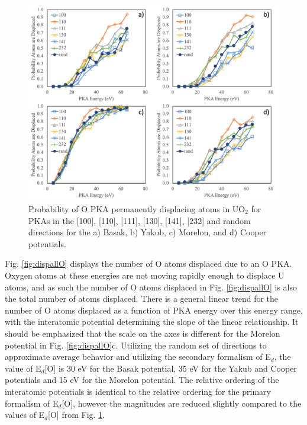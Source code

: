 \documentclass[review]{elsarticle}
\begin{document}
\begin{figure}[h]
 \centering
 \includegraphics[width=1.0\textwidth]{dispO.png}
 \caption{Probability of O PKA permanently displacing atoms in UO$_2$ for PKAs in the [100], [110], [111], [130], [141], [232] and random directions for the a) Basak, b) Yakub, c) Morelon, and d) Cooper potentials.}
 \label{fig:dispO}
\end{figure}

\FloatBarrier

Fig. \ref{fig:dispallO} displays the number of O atoms displaced due to an O PKA. Oxygen atoms at these energies are not moving rapidly enough to displace U atoms, and as such the number of O atoms displaced in Fig. \ref{fig:dispallO} is also the total number of atoms displaced. There is a general linear trend for the number of O atoms displaced as a function of PKA energy over this energy range, with the interatomic potential determining the slope of the linear relationship. It should be emphasized that the scale on the axes is different for the Morelon potential in Fig. \ref{fig:dispallO}c. Utilizing the random set of directions to approximate average behavior and utilizing the secondary formalism of E$_d$, the value of E$_d$[O] is 30 eV for the Basak potential, 35 eV for the Yakub and Cooper potentials and 15 eV for the Morelon potential. The relative ordering of the interatomic potentials is identical to the relative ordering for the primary formalism of E$_d$[O], however the magnitudes are reduced slightly compared to the values of E$_d$[O] from Fig. \ref{fig:dispO}.
\end{document}
